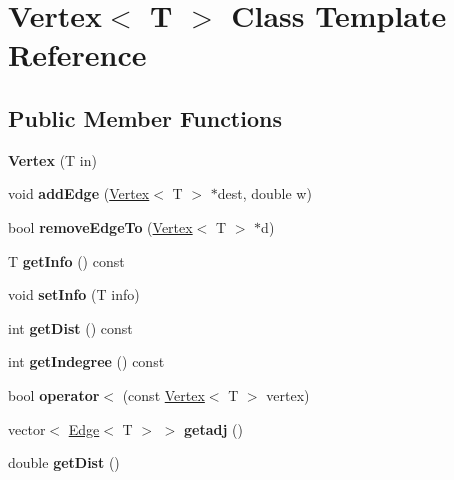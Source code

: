 \hypertarget{class_vertex}{}\section{Vertex$<$ T $>$ Class Template Reference}
\label{class_vertex}
\subsection*{Public Member Functions}
\begin{DoxyCompactItemize}
\item 
\hypertarget{class_vertex_afcbdd4d4198b672356559cb8fa088408}{}\label{class_vertex_afcbdd4d4198b672356559cb8fa088408} 
{\bfseries Vertex} (T in)
\item 
\hypertarget{class_vertex_aeb024eced2da142912f189af6a454db3}{}\label{class_vertex_aeb024eced2da142912f189af6a454db3} 
void {\bfseries add\+Edge} (\hyperlink{class_vertex}{Vertex}$<$ T $>$ $\ast$dest, double w)
\item 
\hypertarget{class_vertex_ab2b5b43fb1709a901b78718436763a84}{}\label{class_vertex_ab2b5b43fb1709a901b78718436763a84} 
bool {\bfseries remove\+Edge\+To} (\hyperlink{class_vertex}{Vertex}$<$ T $>$ $\ast$d)
\item 
\hypertarget{class_vertex_a48eae2f7af2362634adab02b7b2dbec6}{}\label{class_vertex_a48eae2f7af2362634adab02b7b2dbec6} 
T {\bfseries get\+Info} () const
\item 
\hypertarget{class_vertex_a31cd60c26640f8072a928ba70eb2f95e}{}\label{class_vertex_a31cd60c26640f8072a928ba70eb2f95e} 
void {\bfseries set\+Info} (T info)
\item 
\hypertarget{class_vertex_a645a81161bc9f70ebfda8e292b91c24b}{}\label{class_vertex_a645a81161bc9f70ebfda8e292b91c24b} 
int {\bfseries get\+Dist} () const
\item 
\hypertarget{class_vertex_ac78980191ea1f9d22e6617e9e511b755}{}\label{class_vertex_ac78980191ea1f9d22e6617e9e511b755} 
int {\bfseries get\+Indegree} () const
\item 
\hypertarget{class_vertex_a7091b26f281a5041b1775a3d3f9cb7a6}{}\label{class_vertex_a7091b26f281a5041b1775a3d3f9cb7a6} 
bool {\bfseries operator$<$} (const \hyperlink{class_vertex}{Vertex}$<$ T $>$ vertex)
\item 
\hypertarget{class_vertex_a0345efdd03a11cfff112cb00b0ff38e8}{}\label{class_vertex_a0345efdd03a11cfff112cb00b0ff38e8} 
vector$<$ \hyperlink{class_edge}{Edge}$<$ T $>$ $>$ {\bfseries getadj} ()
\item 
\hypertarget{class_vertex_a2d06d0997dd56735bad8baa45f45d3a0}{}\label{class_vertex_a2d06d0997dd56735bad8baa45f45d3a0} 
double {\bfseries get\+Dist} ()
\end{DoxyCompactItemize}
